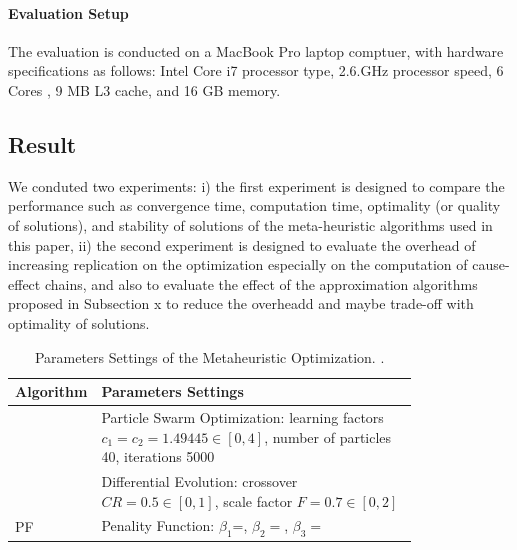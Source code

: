 \paragraph{Evaluation Setup} The evaluation is conducted on a MacBook Pro laptop comptuer, with hardware specifications as follows: Intel Core i7 processor type, 2.6.GHz processor speed, 6 Cores , 9 MB L3 cache, and 16 GB memory.

\subsection{Result}
We conduted two experiments: i) the first experiment is designed to compare the performance  such as convergence time, computation time, optimality (or quality of solutions), and stability of solutions of the meta-heuristic algorithms used in this paper, ii) the second experiment is designed to evaluate the overhead of increasing replication on the optimization especially on the computation of cause-effect chains, and also to evaluate the effect of the approximation algorithms proposed in Subsection x to reduce the overheadd and maybe trade-off with optimality of solutions.
\begin{table}
	\centering\small
	\begin{tabular}{@{}lp{0.8\linewidth}@{}}
		\toprule
		Algorithm & Parameters Settings\\ 
		\midrule
		\pso	& Particle Swarm Optimization: learning factors $c_1=c_2=1.49445\in [0,4]$,  number of particles 40, iterations 5000	\\
		\de	& Differential Evolution: crossover $CR=0.5\in[0,1]$, scale factor $F=0.7\in[0,2]$  \\
		PF& Penality Function:  $\beta_1$=,  $\beta_2=$, $ \beta_3=$\\
		\bottomrule
	\end{tabular}
	\caption{Parameters Settings of the Metaheuristic Optimization. .}
	\label{tbl_para}
\end{table}

